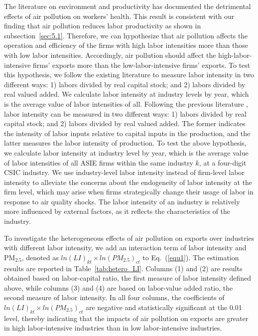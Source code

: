 \documentclass[12pt]{article}
\begin{document}
\label{sec:5.2.2} The literature on environment and productivity %
\citep[e.g.,][]{chang2016particulate,adhvaryu2022management} has documented the
detrimental effects of air pollution on workers' health. This result is
consistent with our finding that air pollution reduces labor productivity as
shown in subsection~\ref{sec:5.1}. Therefore, we can hypothesize that air
pollution affects the operation and efficiency of the firms with high labor
intensities more than those with low labor intensities. Accordingly, air
pollution should affect the high-labor-intensive firms' exports more than
the low-labor-intensive firms' exports. To test this hypothesis, we follow
the existing literature \citep[e.g.,][]{dewenter2001state} to measure labor
intensity in two different ways: 1) labors divided by real capital stock;
and 2) labors divided by real valued added. We calculate labor intensity at
industry levels by year, which is the average value of
labor intensities of all. Following the previous literature %
\citep{dewenter2001state}, labor intensity can be measured in two different
ways: 1) labors divided by real capital stock; and 2) labors divided by real
valued added. The former indicates the intensity of labor inputs relative to capital 
inputs in the production, and the latter measures the labor intensity of production. 
To test the above hypothesis, we calculate labor
intensity at industry level by year, which is the average value of labor
intensities of all ASIE firms within the same industry $k$, at a four-digit CSIC industry. We use industry-level labor intensity
instead of firm-level labor intensity to alleviate the concerns about the
endogeneity of labor intensity at the firm level, which may arise when firms
strategically change their usage of labor in response to air quality shocks.
The labor intensity of an industry is relatively more influenced by external factors, as it reflects
the characteristics of the industry.

To investigate the heterogeneous effects of air pollution on exports over
industries with different labor intensity, we add an interaction term of
labor intensity and $\mathrm{PM_{2.5}}$, denoted as $ln(LI)_{kt} \times ln(PM_{2.5})_{ct}$ to Eq.~(\ref{equ1}). The estimation results are reported in
Table~\ref{tab:hetero_LI}. Columns (1) and (2) are results obtained based on labor-capital ratio, the first measure of labor intensity defined above, while columns (3) and (4) are based on labor-value added ratio, the second measure of labor intensity. 
In all four columns, the coefficients of $ln(LI)_{kt} \times ln(PM_{2.5})_{ct}$ are negative and statistically significant at the 0.01 level,
thereby indicating that the impacts of air pollution on exports are greater in high
labor-intensive industries than in low labor-intensive industries.
\end{document}
